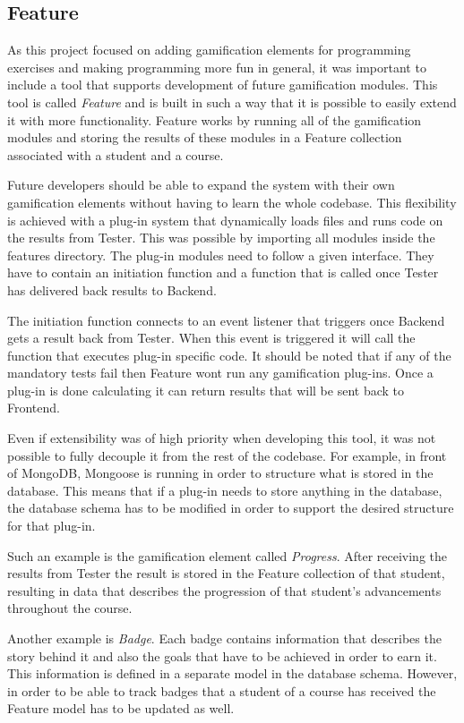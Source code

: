 \subsection{Feature}
As this project focused on adding gamification elements for programming exercises and making programming more fun in general, it was important to include a tool that supports development of future gamification modules. This tool is called \emph{Feature} and is built in such a way that it is possible to easily extend it with more functionality. Feature works by running all of the gamification modules and storing the results of these modules in a Feature collection associated with a student and a course.

Future developers should be able to expand the system with their own gamification elements without having to learn the whole codebase. This flexibility is achieved with a plug-in system that dynamically loads files and runs code on the results from Tester. This was possible by importing all modules inside the features directory. The plug-in modules need to follow a given interface. They have to contain an initiation function and a function that is called once Tester has delivered back results to Backend.

The initiation function connects to an event listener that triggers once Backend gets a result back from Tester. When this event is triggered it will call the function that executes plug-in specific code. It should be noted that if any of the mandatory tests fail then Feature wont run any gamification plug-ins. Once a plug-in is done calculating it can return results that will be sent back to Frontend.

Even if extensibility was of high priority when developing this tool, it was not possible to fully decouple it from the rest of the codebase. For example, in front of MongoDB, Mongoose is running in order to structure what is stored in the database. This means that if a plug-in needs to store anything in the database, the database schema has to be modified in order to support the desired structure for that plug-in.

Such an example is the gamification element called \emph{Progress}. After receiving the results from Tester the result is stored in the Feature collection of that student, resulting in data that describes the progression of that student's advancements throughout the course.

Another example is \emph{Badge}. Each badge contains information that describes the story behind it and also the goals that have to be achieved in order to earn it. This information is defined in a separate model in the database schema. However, in order to be able to track badges that a student of a course has received the Feature model has to be updated as well.

